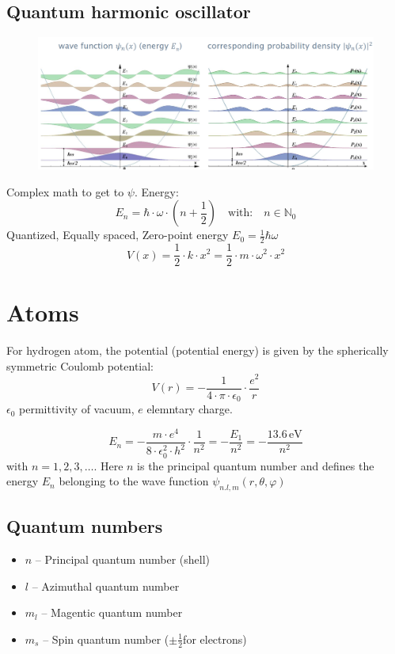 \subsection{Quantum harmonic oscillator}
\begin{figure}[h]
    \centering
    \includegraphics[width=\columnwidth]{images/harmoicoszillator.png}
    \label{fig:harmoszi}
\end{figure}
Complex math to get to \(\psi\).
Energy:
\begin{equation*}
    E_n = \hbar \cdot \omega\cdot (n + \frac{1}{2})\quad \text{with:}\quad n \in \mathbb{N}_0
\end{equation*}
Quantized, Equally spaced, Zero-point energy \(E_0 = \frac{1}{2}\hbar\omega\)
\begin{equation*}
    V(x) = \frac{1}{2}\cdot k \cdot x^2 = \frac{1}{2}\cdot m\cdot \omega^2 \cdot x^2
\end{equation*}
\section{Atoms}
For hydrogen atom, the potential (potential energy) is given by the spherically symmetric Coulomb potential:
\begin{equation*}
    V(r) = - \frac{1}{4\cdot \pi \cdot \epsilon_0}\cdot\frac{e^2}{r}
\end{equation*}
\(\epsilon_0\) permittivity of vacuum, \(e\) elemntary charge.

\begin{equation*}
    E_n = -\frac{m\cdot e^4}{8 \cdot \epsilon_0^2 \cdot h^2}\cdot\frac{1}{n^2}
    = -\frac{E_1}{n^2} = -\frac{13.6 \,\text{eV}}{n^2} 
\end{equation*}
with \(n = 1,2,3,\dots\).
Here \(n\) is the principal quantum number and defines the energy \(E_n\) belonging to the wave function \(\psi_{n.l,m}(r,\theta,\varphi)\)
\subsection{Quantum numbers}
\begin{itemize}
    \item \(n\) -- Principal quantum number (shell)
    \item \(l\) -- Azimuthal quantum number
    \item \(m_l\) -- Magentic quantum number
    \item \(m_s\) -- Spin quantum number (\(\pm \frac{1}{2}\)for electrons)
\end{itemize}

